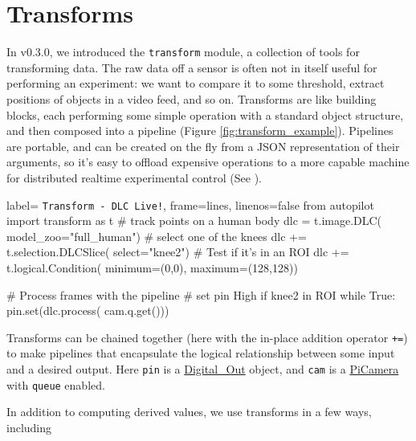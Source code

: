 \section{Transforms}
\label{sec:transforms}

In v0.3.0, we introduced the \texttt{transform} module, a collection of tools for transforming data. The raw data off a sensor is often not in itself useful for performing an experiment: we want to compare it to some threshold, extract positions of objects in a video feed, and so on. Transforms are like building blocks, each performing some simple operation with a standard object structure, and then composed into a pipeline (Figure \ref{fig:transform_example}). Pipelines are portable, and can be created on the fly from a JSON representation of their arguments, so it's easy to offload expensive operations to a more capable machine for distributed realtime experimental control (See \citep{kaneRealtimeLowlatencyClosedloop2020a}). 

\begin{marginfigure}[-2cm]
\begin{pythoncode*}{
label= \texttt{Transform - DLC Live!},
frame=lines,
linenos=false}
from autopilot import transform as t
# track points on a human body
dlc = t.image.DLC(
    model_zoo="full_human")
# select one of the knees
dlc += t.selection.DLCSlice(
    select="knee2")
# Test if it's in an ROI
dlc += t.logical.Condition(
    minimum=(0,0),
    maximum=(128,128))

# Process frames with the pipeline
# set pin High if knee2 in ROI
while True:
    pin.set(dlc.process(
        cam.q.get()))
\end{pythoncode*}
\caption{Transforms can be chained together (here with the in-place addition operator \texttt{+=}) to make pipelines that encapsulate the logical relationship between some input and a desired output. Here \texttt{pin} is a \href{https://docs.auto-pi-lot.com/en/latest/hardware/gpio.html\#autopilot.hardware.gpio.Digital_Out}{Digital\_Out} object, and \texttt{cam} is a \href{https://docs.auto-pi-lot.com/en/latest/hardware/cameras.html\#autopilot.hardware.cameras.PiCamera}{PiCamera} with \texttt{queue} enabled.}
\label{fig:transform_example}

\end{marginfigure}

In addition to computing derived values, we use transforms in a few ways, including

